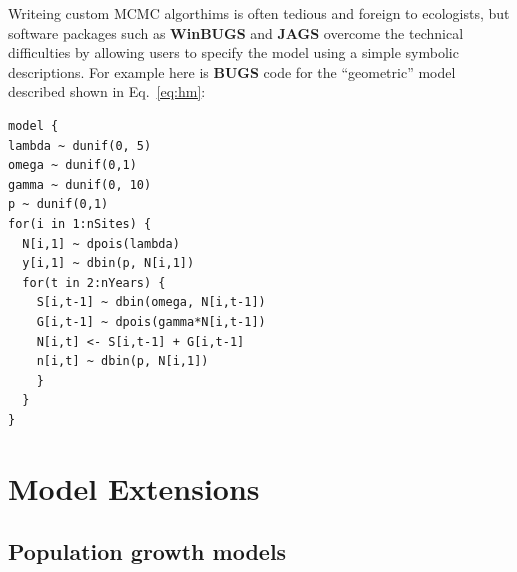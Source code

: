 \documentclass[12pt]{article}
\begin{document}
Writeing custom MCMC algorthims is often tedious and foreign to
ecologists, but software packages such as \textbf{WinBUGS} and
\textbf{JAGS} overcome the technical difficulties by allowing
users to specify the model using a simple symbolic descriptions. For
example here is \textbf{BUGS} code for the ``geometric'' model described
shown
in Eq.~\ref{eq:hm}:
\begin{verbatim}
model {
lambda ~ dunif(0, 5)
omega ~ dunif(0,1)
gamma ~ dunif(0, 10)
p ~ dunif(0,1)
for(i in 1:nSites) {
  N[i,1] ~ dpois(lambda)
  y[i,1] ~ dbin(p, N[i,1])
  for(t in 2:nYears) {
    S[i,t-1] ~ dbin(omega, N[i,t-1])
    G[i,t-1] ~ dpois(gamma*N[i,t-1])
    N[i,t] <- S[i,t-1] + G[i,t-1]
    n[i,t] ~ dbin(p, N[i,1])
    }
  }
}
\end{verbatim}



\section{Model Extensions}
\label{sec:ext}

\subsection{Population growth models}

\end{document}
